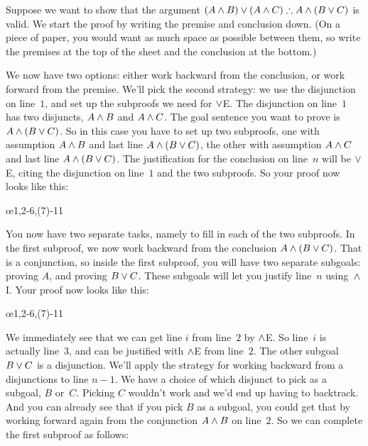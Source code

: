 Suppose we want to show that the argument $(A \eand B) \eor (A \eand C) \therefore A \eand (B \eor C)$ is valid. We start the proof by writing the premise and conclusion down. (On a piece of paper, you would want as much space as possible between them, so write the premises at the top of the sheet and the conclusion at the bottom.)
\begin{fitchproof}
\ellipsesline
\end{fitchproof}
We now have two options: either work backward from the conclusion, or work forward from the premise. We'll pick the second strategy: we use the disjunction on line~$1$, and set up the subproofs we need for $\vee$E. The disjunction on line~$1$ has two disjuncts, $A \wedge B$ and $A \wedge C$. The goal sentence you want to prove is $A \wedge (B \vee C)$. So in this case you have to set up two subproofs, one with assumption $A \wedge B$ and last line $A \wedge (B \vee C)$, the other with assumption $A \wedge C$ and last line $A \wedge (B \vee C)$. The justification for the conclusion on line~$n$ will be $\vee$E, citing the disjunction on line~$1$ and the two subproofs. So your proof now looks like this:
\begin{fitchproof}
	\open
	\ellipsesline 
	\close
	\open
	\ellipsesline
	\close
	\oe{1,2-6,(7)-11}
\end{fitchproof}
You now have two separate tasks, namely to fill in each of the two subproofs. In the first subproof, we now work backward from the conclusion $A \wedge (B \vee C)$. That is a conjunction, so inside the first subproof, you will have two separate subgoals: proving $A$, and proving $B \vee C$. These subgoals will let you justify line~$n$ using~$\wedge$I. Your proof now looks like this:
\begin{fitchproof}
	\open
	\ellipsesline
	\ellipsesline
	\close
	\open
	\ellipsesline
	\close
	\oe{1,2-6,(7)-11}
\end{fitchproof}
We immediately see that we can get line $i$ from line~$2$ by $\wedge$E. So line~$i$ is actually line~$3$, and can be justified with $\wedge$E from line~$2$. The other subgoal $B \vee C$ is a disjunction. We'll apply the strategy for working backward from a disjunctions to line $n-1$. We have a choice of which disjunct to pick as a subgoal, $B$ or~$C$. Picking $C$ wouldn't work and we'd end up having to backtrack. And you can already see that if you pick $B$ as a subgoal, you could get that by working forward again from the conjunction $A \wedge B$ on line~$2$. So we can complete the first subproof as follows:
